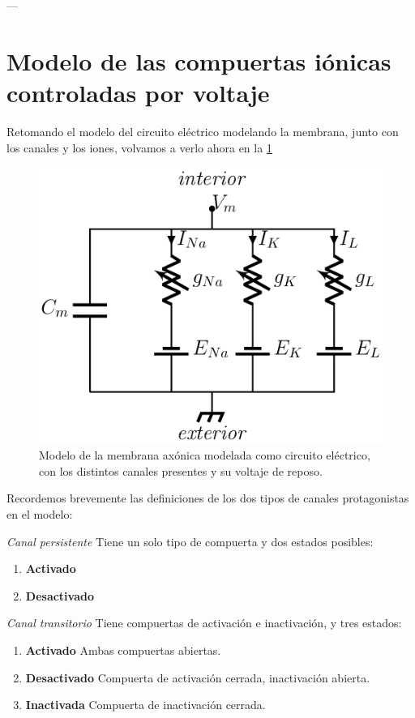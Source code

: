 ---

\section{Modelo de las compuertas iónicas controladas por voltaje}

Retomando el modelo del circuito eléctrico modelando la membrana, junto con los canales y los iones, volvamos a verlo ahora en la \ref{fig:circuito1}

\begin{figure}[H]
 \centering
 \includegraphics[scale=0.5]{../Figuras/circuito.png}
 \caption{Modelo de la membrana axónica modelada como circuito eléctrico, con los distintos canales presentes y su voltaje de reposo.}
 \label{fig:circuito1}
\end{figure}

Recordemos brevemente las definiciones de los dos tipos de canales protagonistas en el modelo:

\begin{definition}
 \emph{Canal persistente} Tiene un solo tipo de compuerta y dos estados posibles:
 \begin{enumerate}
  \item \textbf{Activado}
  \item \textbf{Desactivado}
 \end{enumerate}

\end{definition}

\begin{definition}
 \emph{Canal transitorio} Tiene compuertas de activación e inactivación, y tres estados:
 \begin{enumerate}
  \item \textbf{Activado} Ambas compuertas abiertas.
  \item \textbf{Desactivado} Compuerta de activación cerrada, inactivación abierta.
  \item \textbf{Inactivada} Compuerta de inactivación cerrada.
 \end{enumerate}

\end{definition}


